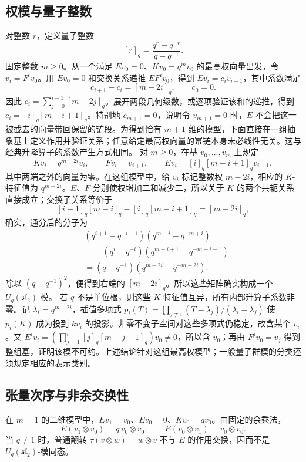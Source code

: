 \subsection{权模与量子整数}
\label{b5:subsec:B01:02}

对整数 \(r\)，定义量子整数
\[
	[r]_q=\frac{q^r-q^{-r}}{q-q^{-1}}.
\]
固定整数 \(m\ge0\)。从一个满足 \(Ev_0=0\)、\(Kv_0=q^mv_0\) 的最高权向量出发，令 \(v_i=F^iv_0\)。用 \(Ev_0=0\) 和交换关系递推 \(EF^iv_0\)，得到 \(Ev_i=c_iv_{i-1}\)，其中系数满足
\[
	c_{i+1}-c_i=[m-2i]_q,\qquad c_0=0.
\]
因此 \(c_i=\sum_{j=0}^{i-1}[m-2j]_q\)。展开两段几何级数，或逐项验证该和的递推，得到 \(c_i=[i]_q[m-i+1]_q\)。特别地 \(c_{m+1}=0\)，说明令 \(v_{m+1}=0\) 时，\(E\) 不会把这一被截去的向量带回保留的链段。为得到恰有 \(m+1\) 维的模型，下面直接在一组抽象基上定义作用并验证关系；任意给定最高权向量的幂链本身未必线性无关。这与经典升降算子的系数产生方式相同。 对 \(m\ge0\)，在基 \(v_0,\ldots,v_m\) 上规定
\[
	Kv_i=q^{m-2i}v_i,\qquad Fv_i=v_{i+1},\qquad Ev_i=[i]_q[m-i+1]_qv_{i-1},
\]
其中两端之外的向量为零。在这组模型中，给 \(v_i\) 标记整数权 \(m-2i\)，相应的 \(K\)-特征值为 \(q^{m-2i}\)。\(E\)、\(F\) 分别使权增加二和减少二，所以关于 \(K\) 的两个共轭关系直接成立；交换子关系等价于
\[
	[i+1]_q[m-i]_q-[i]_q[m-i+1]_q=[m-2i]_q,
\]
确实，通分后的分子为
\[
	\begin{aligned}
		&(q^{i+1}-q^{-i-1})(q^{m-i}-q^{-m+i})\\
		&\quad-(q^i-q^{-i})(q^{m-i+1}-q^{-m+i-1})\\
		&=(q-q^{-1})(q^{m-2i}-q^{-m+2i}).
	\end{aligned}
\]
除以 \((q-q^{-1})^2\)，便得到右端的 \([m-2i]_q\)。所以这些矩阵确实构成一个 \(U_q(\mathfrak{sl}_2)\) 模。
\ProseParagraphBreak
若 \(q\) 不是单位根，则这些 \(K\)-特征值互异，所有内部升算子系数非零。记 \(\lambda_i=q^{m-2i}\)，插值多项式 \(p_i(T)=\prod_{j\ne i}(T-\lambda_j)/(\lambda_i-\lambda_j)\) 使 \(p_i(K)\) 成为投到 \(kv_i\) 的投影。非零不变子空间对这些多项式仍稳定，故含某个 \(v_i\)。又 \(E^iv_i=(\prod_{j=1}^i[j]_q[m-j+1]_q)v_0\ne0\)，所以含 \(v_0\)；再由 \(F^jv_0=v_j\) 得到整组基，证明该模不可约。上述结论针对这组最高权模型；一般量子群模的分类还须规定相应的表示类别。

\subsection{张量次序与非余交换性}
\label{b5:subsec:B01:03}

在 \(m=1\) 的二维模型中，\(Ev_1=v_0\)、\(Ev_0=0\)、\(Kv_0=qv_0\)。由固定的余乘法，
\[
	E(v_1\otimes v_0)=q\,v_0\otimes v_0,\qquad E(v_0\otimes v_1)=v_0\otimes v_0.
\]
当 \(q\ne1\) 时，普通翻转 \(\tau(v\otimes w)=w\otimes v\) 不与 \(E\) 的作用交换，因而不是 \(U_q(\mathfrak{sl}_2)\)-模同态。

